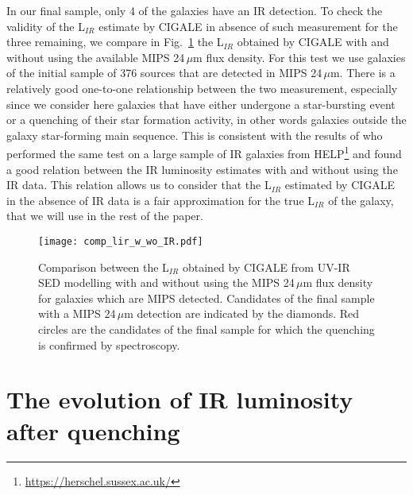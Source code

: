 \documentclass[traditabstract]{aa} %
\begin{document}
In our final sample, only 4 of the galaxies have an IR detection.
To check the validity of the L$_{IR}$ estimate by CIGALE in absence of such measurement for the three remaining, we compare in Fig.~\ref{comp_lir} the L$_{IR}$ obtained by CIGALE with and without using the available MIPS 24\,$\mu$m flux density.
For this test we use galaxies of the initial sample of 376 sources that are detected in MIPS 24\,$\mu$m.
There is a relatively good one-to-one relationship between the two measurement, especially since we consider here galaxies that have either undergone a star-bursting event or a quenching of their star formation activity, in other words galaxies outside the galaxy star-forming main sequence.
This is consistent with the results of \cite{Malek18} who performed the same test on a large sample of IR galaxies from HELP\footnote{\url{https://herschel.sussex.ac.uk/}} \citep[\textit{Herschel} Extragalactic Legacy Project][]{Vaccari16} and found a good relation between the IR luminosity estimates with and without using the IR data. 
This relation allows us to consider that the L$_{IR}$ estimated by CIGALE in the absence of IR data is a fair approximation for the true L$_{IR}$ of the galaxy, that we will use in the rest of the paper.

\begin{figure}[!h] 
  	\texttt{[image: comp\_lir\_w\_wo\_IR.pdf]}
  	\caption{\label{comp_lir} Comparison between the L$_{IR}$ obtained by CIGALE from UV-IR SED modelling with and without using the MIPS 24\,$\mu$m flux density for galaxies which are MIPS detected. Candidates of the final sample with a MIPS 24\,$\mu$m detection are indicated by the diamonds. Red circles are the candidates of the final sample for which the quenching is confirmed by spectroscopy.}
\end{figure}


\section{\label{evol}The evolution of IR luminosity after quenching}
\end{document}
